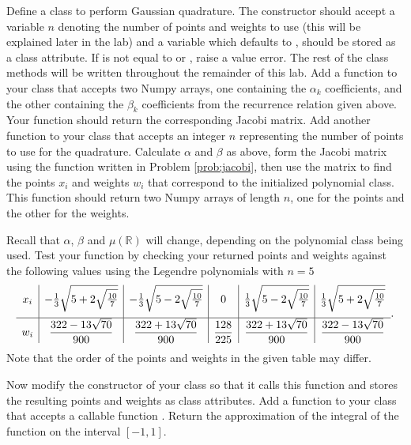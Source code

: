 
Define a class to perform Gaussian quadrature.
The constructor should accept a variable $n$ denoting the number of points and weights to use (this will be explained later in the lab) and a variable  which defaults to , 
 should be stored as a class attribute.
If  is not equal to  or , raise a value error.
The rest of the class methods will be written throughout the remainder of this lab.
\label{prob:jacobi}
Add a function to your class that accepts two Numpy arrays, one containing the $\alpha_k$ coefficients, and the other containing the $\beta_k$ coefficients from the recurrence relation given above.
Your function should return the corresponding Jacobi matrix.
Add another function to your class that accepts an integer $n$ representing the number of points to use for the quadrature.
Calculate $\alpha$ and $\beta$ as above, form the Jacobi matrix using the function written in Problem \ref{prob:jacobi}, then use the matrix to find the points $x_i$ and weights $w_i$ that 
correspond to the initialized polynomial class.
This function should return two Numpy arrays of length $n$, one for the points and the other for the weights.

Recall that $\alpha$, $\beta$ and $\mu(\mathbb{R})$ will change, depending on the polynomial class being used.
Test your function by checking your returned points and weights against the following values using the Legendre polynomials with $n=5$
\[
\centering %
\begin{array}{c|c|c|c|c|c}
    x_i
    & -\frac{1}{3}\sqrt{5 + 2\sqrt{\frac{10}{7}}}
    & -\frac{1}{3}\sqrt{5 - 2\sqrt{\frac{10}{7}}}
    & 0
    & \frac{1}{3}\sqrt{5 - 2\sqrt{\frac{10}{7}}}
    & \frac{1}{3}\sqrt{5 + 2\sqrt{\frac{10}{7}}}
    \\[1em] \hline
    w_i
    & \dfrac{322-13\sqrt{70}}{900}
    & \dfrac{322+13\sqrt{70}}{900}
    & \dfrac{128}{225}
    & \dfrac{322+13\sqrt{70}}{900}
    & \dfrac{322-13\sqrt{70}}{900}
\end{array}.
\]
Note that the order of the points and weights in the given table may differ.

Now modify the constructor of your class so that it calls this function and stores the resulting points and weights as class attributes.
Add a function to your class that accepts a callable function .
Return the approximation of the integral of the function  on the interval $[-1,1]$.

